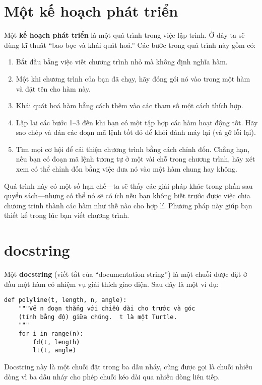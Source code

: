 \documentclass[11pt]{book}
\begin{document}
\section{Một kế hoạch phát triển}

Một {\bf kế hoạch phát triển} là một quá trình trong việc lập trình.
Ở đây ta sẽ dùng kĩ thuât ``bao bọc và khái quát hoá.''  
Các bước trong quá trình này gồm có:

\begin{enumerate}

\item Bắt đầu bằng việc viết chương trình nhỏ mà không định nghĩa hàm.

\item Một khi chương trình của bạn đã chạy, hãy đóng gói nó vào trong
một hàm và đặt tên cho hàm này.

\item Khái quát hoá hàm bằng cách thêm vào các tham số một cách thích hợp.

\item Lặp lại các bước 1--3 đến khi bạn có một tập hợp các hàm hoạt động
tốt. Hãy sao chép và dán các đoạn mã lệnh tốt đó để khỏi đánh máy lại (và
gỡ lỗi lại).

\item Tìm mọi cơ hội để cải thiện chương trình bằng cách chỉnh đốn. Chẳng
hạn, nếu bạn có đoạn mã lệnh tương tự ở một vài chỗ trong chương trình,
hãy xét xem có thể chỉnh đốn bằng việc đưa nó vào một hàm chung hay không.

\end{enumerate}

Quá trình này có một số hạn chế---ta sẽ thấy các giải pháp khác trong
phần sau quyển sách---nhưng có thể nó sẽ có ích nếu bạn không biết trước
được việc chia chương trình thành các hàm như thế nào cho hợp lí. Phương
pháp này giúp bạn thiết kế trong lúc bạn viết chương trình.


\section{docstring}
\label{docstring}

Một {\bf docstring} (viết tắt của ``documentation string'') là một chuỗi
được đặt ở đầu một hàm có nhiệm vụ giải thích giao diện. Sau đây
là một ví dụ:

\beforeverb
\begin{verbatim}
def polyline(t, length, n, angle):
    """Vẽ n đoạn thẳng với chiều dài cho trước và góc
    (tính bằng độ) giữa chúng.  t là một Turtle.
    """    
    for i in range(n):
        fd(t, length)
        lt(t, angle)
\end{verbatim}
\afterverb
%
Docstring này là một chuỗi đặt trong ba dấu nháy, cũng được gọi
là chuỗi nhiều dòng vì ba dấu nháy cho phép chuỗi kéo dài qua
nhiều dòng liên tiếp.
\end{document}
